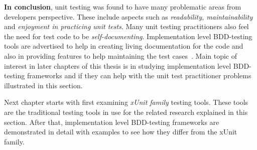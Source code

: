     \textbf{In conclusion}, unit testing was found to have many problematic areas from developers perspective.
    These include aspects such as \textit{readability,
    maintainability} and \textit{enjoyment in practicing unit tests}. Many unit testing practitioners also feel the need for
    test code to be \textit{self-documenting}. Implementation level BDD-testing tools are advertised to
    help in creating living documentation for the code and also in providing features to help maintaining the test cases~\cite{smart2014bdd}.
    Main topic of interest in later chapters of this thesis is in studying implementation level BDD-testing frameworks and
    if they can help with the unit test practitioner problems illustrated in this section.

    Next chapter starts with first examining \textit{xUnit family} testing tools. These tools are the traditional testing tools in use for the
    related research explained in this section. After that, implementation level BDD-testing frameworks are demonstrated in detail
    with examples to see how they differ from the xUnit family.




